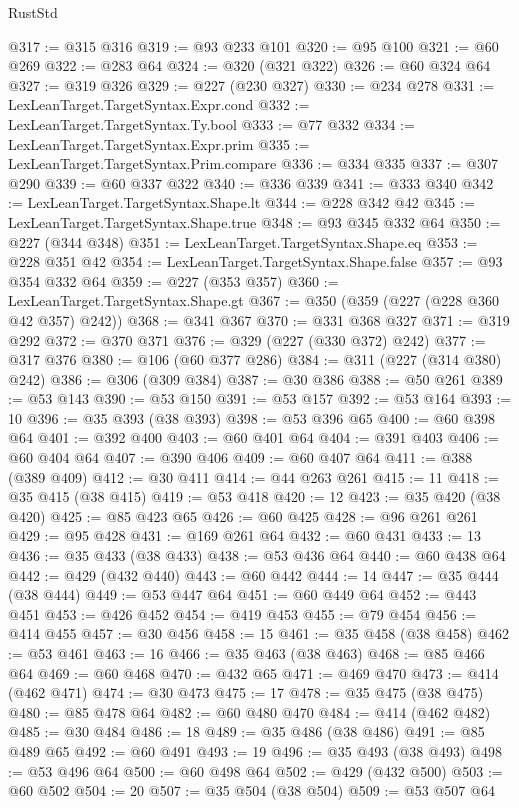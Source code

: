 \begin{lexlean}{RustStd}
\begin{coremodule}
{\begin{coremodule}
{{{{{{{{{{{{{{{{{{{{{{{{{{{{{@317 := @315 @316
@319 := @93 @233 @101
@320 := @95 @100
@321 := @60 @269
@322 := @283 @64
@324 := @320 (@321 @322)
@326 := @60 @324 @64
@327 := @319 @326
@329 := @227 (@230 @327)
@330 := @234 @278
@331 := LexLeanTarget.TargetSyntax.Expr.cond
@332 := LexLeanTarget.TargetSyntax.Ty.bool
@333 := @77 @332
@334 := LexLeanTarget.TargetSyntax.Expr.prim
@335 := LexLeanTarget.TargetSyntax.Prim.compare
@336 := @334 @335
@337 := @307 @290
@339 := @60 @337 @322
@340 := @336 @339
@341 := @333 @340
@342 := LexLeanTarget.TargetSyntax.Shape.lt
@344 := @228 @342 @42
@345 := LexLeanTarget.TargetSyntax.Shape.true
@348 := @93 @345 @332 @64
@350 := @227 (@344 @348)
@351 := LexLeanTarget.TargetSyntax.Shape.eq
@353 := @228 @351 @42
@354 := LexLeanTarget.TargetSyntax.Shape.false
@357 := @93 @354 @332 @64
@359 := @227 (@353 @357)
@360 := LexLeanTarget.TargetSyntax.Shape.gt
@367 := @350 (@359 (@227 (@228 @360 @42 @357) @242))
@368 := @341 @367
@370 := @331 @368 @327
@371 := @319 @292
@372 := @370 @371
@376 := @329 (@227 (@330 @372) @242)
@377 := @317 @376
@380 := @106 (@60 @377 @286)
@384 := @311 (@227 (@314 @380) @242)
@386 := @306 (@309 @384)
@387 := @30 @386
@388 := @50 @261
@389 := @53 @143
@390 := @53 @150
@391 := @53 @157
@392 := @53 @164
@393 := 10
@396 := @35 @393 (@38 @393)
@398 := @53 @396 @65
@400 := @60 @398 @64
@401 := @392 @400
@403 := @60 @401 @64
@404 := @391 @403
@406 := @60 @404 @64
@407 := @390 @406
@409 := @60 @407 @64
@411 := @388 (@389 @409)
@412 := @30 @411
@414 := @44 @263 @261
@415 := 11
@418 := @35 @415 (@38 @415)
@419 := @53 @418
@420 := 12
@423 := @35 @420 (@38 @420)
@425 := @85 @423 @65
@426 := @60 @425
@428 := @96 @261 @261
@429 := @95 @428
@431 := @169 @261 @64
@432 := @60 @431
@433 := 13
@436 := @35 @433 (@38 @433)
@438 := @53 @436 @64
@440 := @60 @438 @64
@442 := @429 (@432 @440)
@443 := @60 @442
@444 := 14
@447 := @35 @444 (@38 @444)
@449 := @53 @447 @64
@451 := @60 @449 @64
@452 := @443 @451
@453 := @426 @452
@454 := @419 @453
@455 := @79 @454
@456 := @414 @455
@457 := @30 @456
@458 := 15
@461 := @35 @458 (@38 @458)
@462 := @53 @461
@463 := 16
@466 := @35 @463 (@38 @463)
@468 := @85 @466 @64
@469 := @60 @468
@470 := @432 @65
@471 := @469 @470
@473 := @414 (@462 @471)
@474 := @30 @473
@475 := 17
@478 := @35 @475 (@38 @475)
@480 := @85 @478 @64
@482 := @60 @480 @470
@484 := @414 (@462 @482)
@485 := @30 @484
@486 := 18
@489 := @35 @486 (@38 @486)
@491 := @85 @489 @65
@492 := @60 @491
@493 := 19
@496 := @35 @493 (@38 @493)
@498 := @53 @496 @64
@500 := @60 @498 @64
@502 := @429 (@432 @500)
@503 := @60 @502
@504 := 20
@507 := @35 @504 (@38 @504)
@509 := @53 @507 @64
}}}}}}}}}}}}}}}}}}}}}}}}}}}}}
\end{coremodule}}
\end{coremodule}
\end{lexlean}
